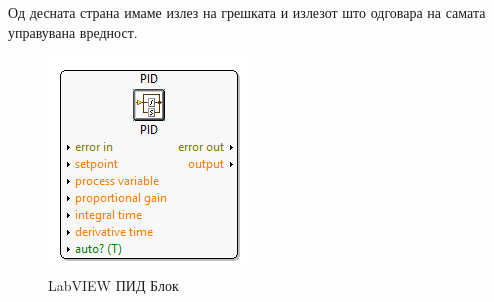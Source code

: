 \documentclass[12pt]{article}
\begin{document}
			Од десната страна имаме излез на грешката и излезот што одговара на самата управувана вредност.

			\begin{figure}[H]
				\includegraphics[width=0.3\linewidth]{./images/PIDBlock.png}
				\centering
				\caption{LabVIEW ПИД Блок}
				\label{fig:PIDBlock.png}
				\end{figure}

\newpage

\medskip
\nocite{*}
\printbibliography[heading=bibintoc,title={Користена литература}]
\end{document}

